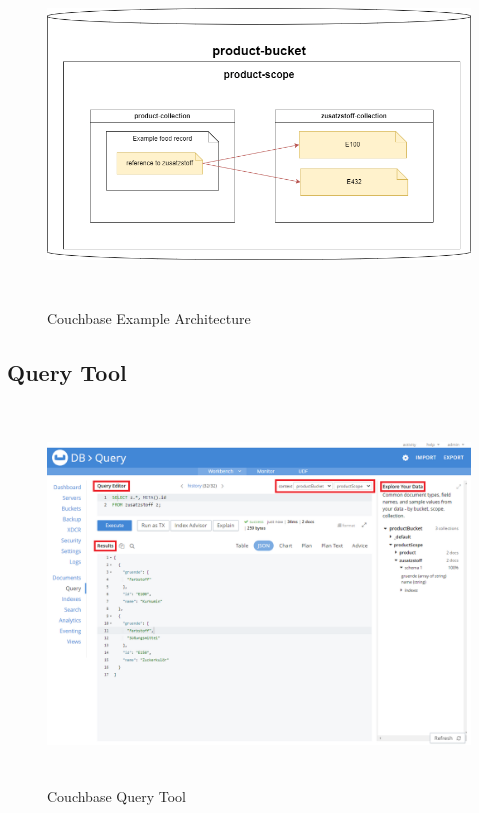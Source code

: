 \begin{figure}[H]
    \centering
        \includegraphics[height=9cm]{images/Architecture_Example_Couchbase.png}
    \caption{Couchbase Example Architecture}
    \label{fig:CouchbaseExampleArchitecture}
\end{figure}

\subsection{Query Tool}

\begin{figure}[H]
    \centering
        \includegraphics[height=10cm]{images/Query_Tool_Couchbase_marked.png}
    \caption{Couchbase Query Tool}
    \label{fig:CouchbaseQueryTool}
\end{figure}

